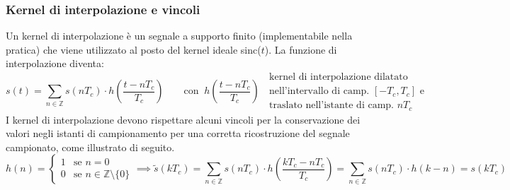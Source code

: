\subsubsection*{Kernel di interpolazione e vincoli}
Un kernel di interpolazione è un segnale a supporto finito (implementabile nella pratica) che viene utilizzato al
posto del kernel ideale sinc(\(t\)). La funzione di interpolazione diventa:
\[s(t) = \sum_{n \in \mathbb{Z}} s(n T_c) \cdot h\!\left(\frac{t - n T_c}{T_c}\right) \qquad \text{con} \;\; h\!\left(\frac{t - n T_c}{T_c}\right) \;\; \begin{array}{c}
	\text{kernel di interpolazione dilatato} \\
	\text{nell'intervallo di camp. } [-T_c, T_c] \text{ e}\\
	\text{traslato nell'istante di camp. } n T_c
\end{array}\]
I kernel di interpolazione devono rispettare alcuni vincoli per la conservazione dei valori negli istanti di campionamento
per una corretta ricostruzione del segnale campionato, come illustrato di seguito.
\[h(n) = \begin{cases}
	1 & \text{se } n = 0 \\
	0 & \text{se } n \in \mathbb{Z} \setminus \! \{0\}
\end{cases} \implies \tilde{s}(kT_c) = \sum_{n \in \mathbb{Z}} s(nT_c) \cdot h\!\left(\frac{kT_c - nT_c}{T_c}\right) = \sum_{n \in \mathbb{Z}} s(nT_c) \cdot h(k\!-\!n) = s(kT_c)\]

